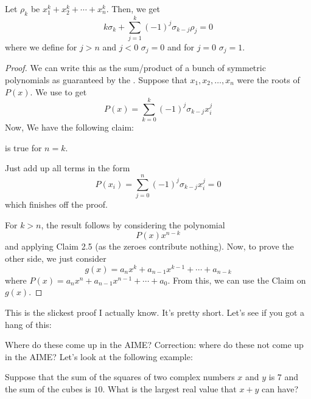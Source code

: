 \documentclass[11pt,titlepage]{scrartcl}
\newenvironment{hint}{\footnotesize \normalfont \textbf{Hints}:}{\hspace{-0.5ex}}
\begin{document}
\begin{theorem}\label{nf}
Let $\rho_k$ be $x_1^k+x_2^k+\cdots+x_n^k$. Then, we get
\[k\sigma_k+\sum_{j=1}^{k}(-1)^{j}\sigma_{k-j}\rho_j=0\]
where we define for $j>n$ and $j<0$ $\sigma_j=0$ and for $j=0$ $\sigma_j=1$.
\end{theorem}
\begin{proof}
We can write this as the sum/product of a bunch of symmetric polynomials as guaranteed by the . Suppose that $x_1,x_2,\ldots,x_n$ were the roots of $P(x)$. We use  to get
\[P(x)=\sum_{k=0}^{k}(-1)^j\sigma_{k-j}x_i^j\]
Now, We have the following claim:
\begin{claim}
 is true for $n=k$.
\end{claim}
\begin{subproof}
Just add up all terms in the form
\[P(x_i)=\sum_{j=0}^n(-1)^j\sigma_{k-j}x_i^j=0\]
which finishes off the proof.
\end{subproof}
For $k>n$, the result follows by considering the polynomial
\[P(x)x^{n-k}\]
and applying Claim 2.5 (as the zeroes contribute nothing). Now, to prove the other side, we just consider
\[g(x)=a_nx^k+a_{n-1}x^{k-1}+\cdots+a_{n-k}\]
where $P(x)=a_nx^n+a_{n-1}x^{n-1}+\cdots+a_0$. From this, we can use the Claim on $g(x)$.
\end{proof}
This is the slickest proof I actually know. It's pretty short. Let's see if you got a hang of this:
\begin{exercisebox}
\end{exercisebox}
Where do these come up in the AIME? Correction: where do these not come up in the AIME? Let's look at the following example:
\begin{example}\label{interesting}
Suppose that the sum of the squares of two complex numbers $x$ and $y$ is $7$ and the sum of the cubes is $10$. What is the largest real value that $x + y$ can have?
\end{example}
\end{document}
